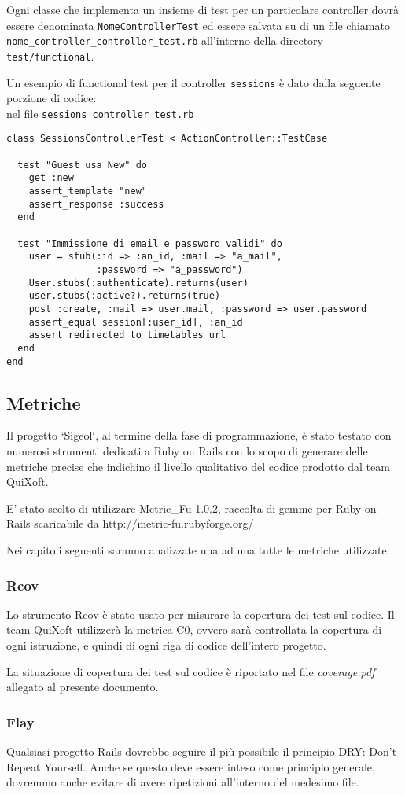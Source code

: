 \documentclass[11pt,a4paper]{article}
\begin{document}
Ogni classe che implementa un insieme di test per un particolare controller dovrà essere denominata \verb|NomeControllerTest| ed essere salvata su di un file chiamato \verb|nome_controller_controller_test.rb| all'interno della directory \verb|test/functional|.

Un esempio di functional test per il controller \verb|sessions| è dato dalla seguente porzione di codice: \\
nel file \verb|sessions_controller_test.rb|
\begin{verbatim}
class SessionsControllerTest < ActionController::TestCase

  test "Guest usa New" do
    get :new
    assert_template "new"
    assert_response :success
  end

  test "Immissione di email e password validi" do
    user = stub(:id => :an_id, :mail => "a_mail",
                :password => "a_password")
    User.stubs(:authenticate).returns(user)
    user.stubs(:active?).returns(true)
    post :create, :mail => user.mail, :password => user.password
    assert_equal session[:user_id], :an_id
    assert_redirected_to timetables_url
  end
end
\end{verbatim}
\subsection{Metriche}
Il progetto `Sigeol`, al termine della fase di programmazione, è stato testato con numerosi strumenti dedicati a Ruby on Rails con lo scopo di generare delle metriche precise che indichino il livello qualitativo del codice prodotto dal team QuiXoft.

E' stato scelto di utilizzare Metric\_Fu 1.0.2, raccolta di gemme per Ruby on Rails scaricabile da http://metric-fu.rubyforge.org/

Nei capitoli seguenti saranno analizzate una ad una tutte le metriche utilizzate:
\subsubsection{Rcov}
Lo strumento Rcov è stato usato per misurare la copertura dei test sul codice. Il team QuiXoft utilizzerà la metrica C0, ovvero sarà controllata la copertura di ogni istruzione, e quindi di ogni riga di codice dell'intero progetto.

La situazione di copertura dei test sul codice è riportato nel file \textit{coverage.pdf} allegato al presente documento.
\subsubsection{Flay}
Qualsiasi progetto Rails dovrebbe seguire il più possibile il principio DRY: Don't Repeat Yourself.
Anche se questo deve essere inteso come principio generale, dovremmo anche evitare di avere ripetizioni all’interno del medesimo file.
\end{document}
